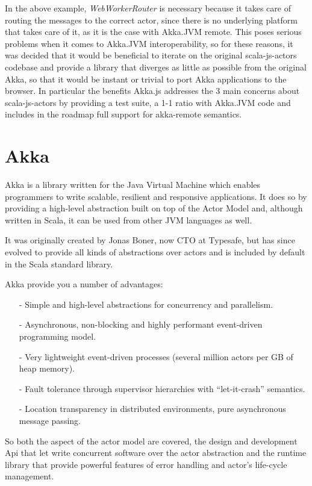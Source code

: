 \documentclass{sig-alternate}
\begin{document}
In the above example, \emph{WebWorkerRouter} is necessary because it takes care of routing the messages to the
correct actor, since there is no underlying platform that takes care of it, as it is the case with Akka.JVM remote.
This poses serious problems when it comes to Akka.JVM interoperability, so for these reasons, it was decided 
that it would be beneficial to iterate on the original scala-js-actors codebase and provide a library that 
diverges as little as possible from the original Akka, so that it would be instant or trivial to port Akka 
applications to the browser.
In particular the benefits Akka.js addresses the 3 main concerns about scala-js-actors by providing a 
test suite, a 1-1 ratio with Akka.JVM code and includes in the roadmap full support for akka-remote
semantics.

\section{Akka}\label{sec:akka}

Akka is a library written for the Java Virtual Machine which enables programmers to write
scalable, resilient and responsive applications. It does so by providing a high-level
abstraction built on top of the Actor Model and, although written in Scala, it can be used
from other JVM languages as well.

It was originally created by Jonas Boner, now CTO at Typesafe, but has since evolved to
provide all kinds of abstractions over actors and is included by default in the Scala 
standard library.

Akka provide you a number of advantages:
\begin{itemize}
	\item[-] Simple and high-level abstractions for concurrency and parallelism.
	\item[-] Asynchronous, non-blocking and highly performant event-driven programming model.
	\item[-] Very lightweight event-driven processes (several million actors per GB of heap memory).
	\item[-] Fault tolerance through supervisor hierarchies with ``let-it-crash'' semantics.
	\item[-] Location transparency in distributed environments, pure asynchronous message passing. 
\end{itemize}

So both the aspect of the actor model are covered, the design and development Api that let write concurrent software over the actor abstraction and the runtime library that provide powerful features of error handling and actor's life-cycle management.
\\\\
\end{document}
